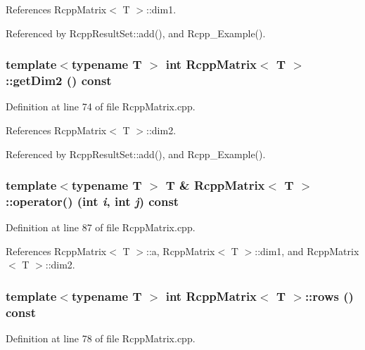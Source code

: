 References RcppMatrix$<$ T $>$::dim1.

Referenced by RcppResultSet::add(), and Rcpp\_\-Example().\hypertarget{classRcppMatrix_a10bd09feab53fdb931f5f654db21ebc9}{
\subsubsection[{getDim2}]{\setlength{\rightskip}{0pt plus 5cm}template$<$typename T $>$ int {\bf RcppMatrix}$<$ T $>$::getDim2 () const}}
\label{classRcppMatrix_a10bd09feab53fdb931f5f654db21ebc9}


Definition at line 74 of file RcppMatrix.cpp.

References RcppMatrix$<$ T $>$::dim2.

Referenced by RcppResultSet::add(), and Rcpp\_\-Example().\hypertarget{classRcppMatrix_a20f4baf657160d8708f941bb99faa33a}{
\subsubsection[{operator()}]{\setlength{\rightskip}{0pt plus 5cm}template$<$typename T $>$ T \& {\bf RcppMatrix}$<$ T $>$::operator() (int {\em i}, \/  int {\em j}) const}}
\label{classRcppMatrix_a20f4baf657160d8708f941bb99faa33a}


Definition at line 87 of file RcppMatrix.cpp.

References RcppMatrix$<$ T $>$::a, RcppMatrix$<$ T $>$::dim1, and RcppMatrix$<$ T $>$::dim2.\hypertarget{classRcppMatrix_aa32cfb9a1d44e5aee0c332a12fbe37c1}{
\subsubsection[{rows}]{\setlength{\rightskip}{0pt plus 5cm}template$<$typename T $>$ int {\bf RcppMatrix}$<$ T $>$::rows () const}}
\label{classRcppMatrix_aa32cfb9a1d44e5aee0c332a12fbe37c1}


Definition at line 78 of file RcppMatrix.cpp.

